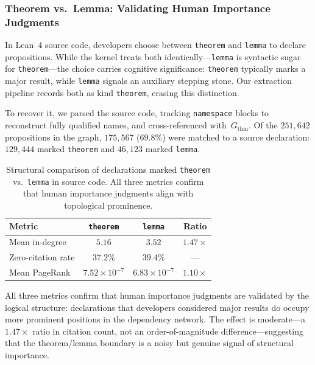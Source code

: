 \subsubsection{Theorem vs.\ Lemma: Validating Human Importance Judgments}
\label{sec:thm-vs-lemma}

In Lean~4 source code, developers choose between \texttt{theorem} and \texttt{lemma} to declare propositions. While the kernel treats both identically---\texttt{lemma} is syntactic sugar for \texttt{theorem}---the choice carries cognitive significance: \texttt{theorem} typically marks a major result, while \texttt{lemma} signals an auxiliary stepping stone. Our extraction pipeline records both as kind \texttt{theorem}, erasing this distinction.

To recover it, we parsed the  source code, tracking \texttt{namespace} blocks to reconstruct fully qualified names, and cross-referenced with~$G_{\mathrm{thm}}$. Of the $251{,}642$ propositions in the graph, $175{,}567$ ($69.8\%$) were matched to a source declaration: $129{,}444$ marked \texttt{theorem} and $46{,}123$ marked \texttt{lemma}.

\begin{table}[ht]
\centering
\begin{tabular}{lccc}
\toprule
Metric & \texttt{theorem} & \texttt{lemma} & Ratio \\
\midrule
Mean in-degree        & $5.16$ & $3.52$ & $1.47\times$ \\
Zero-citation rate    & $37.2\%$ & $39.4\%$ & --- \\
Mean PageRank         & $7.52 \times 10^{-7}$ & $6.83 \times 10^{-7}$ & $1.10\times$ \\
\bottomrule
\end{tabular}
\caption{Structural comparison of declarations marked \texttt{theorem} vs.\ \texttt{lemma} in source code. All three metrics confirm that human importance judgments align with topological prominence.}
\label{tab:thm-vs-lemma}
\end{table}

All three metrics confirm that human importance judgments are validated by the logical structure: declarations that developers considered major results do occupy more prominent positions in the dependency network. The effect is moderate---a $1.47\times$ ratio in citation count, not an order-of-magnitude difference---suggesting that the theorem/lemma boundary is a noisy but genuine signal of structural importance.

